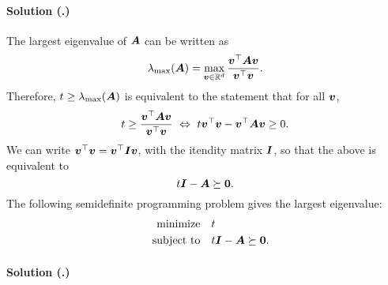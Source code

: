 \documentclass{article}
\newcounter{problemSheetNumber}
\newcounter{problems}
\renewcommand{\solution}[1]{\paragraph{Solution (\theproblemSheetNumber.\theproblems)}\addtocounter{problems}{1}\label{#1}}
\begin{document}
\solution{pr:1} The largest eigenvalue of $\bm{A}$ can be written as
\begin{equation*}
 \lambda_{\mathrm{max}}(\bm{A}) = \max_{\bm{v}\in \mathbb{R}^d} \frac{\bm{v}^{\top}\bm{A}\bm{v}}{\bm{v}^{\top}\bm{v}}.
\end{equation*}
Therefore, $t\geq \lambda_{\mathrm{max}}(\bm{A})$ is equivalent to the statement that for all $\bm{v}$,
\begin{equation*}
 t\geq \frac{\vct{v}^{\trans}\mtx{A}\vct{v}}{\vct{v}^{\trans}\vct{v}} \ \Leftrightarrow \ t\vct{v}^{\trans}\vct{v}-\vct{v}^{\trans}\mtx{A}\vct{v}\geq 0.
\end{equation*}
We can write $\bm{v}^{\top}\bm{v}=\bm{v}^{\top}\bm{I}\bm{v}$, with the itendity matrix $\bm{I}$, so that the above is equivalent to
\begin{equation*}
 t\bm{I}-\bm{A}\succeq \bm{0}.
\end{equation*}
The following semidefinite programming problem gives the largest eigenvalue:
\begin{align*}
 \text{minimize}\quad & t\\
 \quad\text{subject to}\quad & t\bm{I}-\bm{A}\succeq \bm{0}.
\end{align*}

\solution{pr:2} 
\end{document}
